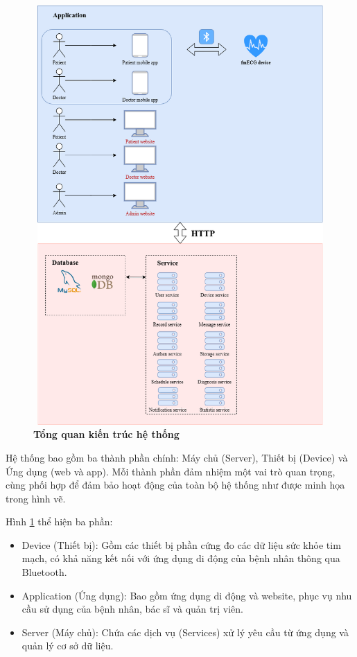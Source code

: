 \begin{figure}[H]
	\centering
	\includegraphics[width=12cm,height=16cm]{Images/System/fmECG_architecture-System_Architecture.drawio.png}
	\caption[Tổng quan kiến trúc hệ thống]{\bfseries \fontsize{12pt}{0pt}\selectfont Tổng quan kiến trúc hệ thống}
	\label{fmECG_architecture-System} %
\end{figure}
Hệ thống bao gồm ba thành phần chính: Máy chủ (Server), Thiết bị (Device) và Ứng dụng (web và app).
Mỗi thành phần đảm nhiệm một vai trò quan trọng, cùng phối hợp để đảm bảo hoạt động của toàn bộ hệ thống như được minh họa trong hình vẽ.

Hình \ref{fmECG_architecture-System} thể hiện ba phần:

\begin{adjustwidth}{1.5em}{}
	\begin{itemize}
		\item Device (Thiết bị): Gồm các thiết bị phần cứng đo các dữ liệu sức khỏe tim mạch, có khả năng kết nối với ứng dụng di động của bệnh nhân thông qua Bluetooth.
		\item Application (Ứng dụng): Bao gồm ứng dụng di động và website, phục vụ nhu cầu sử dụng của bệnh nhân, bác sĩ và quản trị viên.
		\item Server (Máy chủ): Chứa các dịch vụ (Services) xử lý yêu cầu từ ứng dụng và quản lý cơ sở dữ liệu.
	\end{itemize}
\end{adjustwidth}

